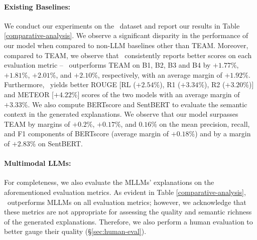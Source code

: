 


\paragraph{Existing Baselines:} We conduct our experiments on the \dataset\ dataset and report our results in Table \ref{comparative-analysis}. We observe a significant disparity in the performance of our model when compared to non-LLM baselines other than TEAM. Moreover, compared to TEAM, we observe that \model\ consistently reports better scores on each evaluation metric -- \model\ outperforms TEAM on B1, B2, B3 and B4 by $+1.77\%$, $+1.81\%$, $+2.01\%$, and $+2.10\%$, respectively, with an average margin of $+1.92\%$. Furthermore, \model\ yields better ROUGE [RL ($+2.54\%$), R1 ($+3.34\%$), R2 ($+3.20\%$)] and METEOR [$+4.22\%$] scores of the two models with an average margin of $+3.33\%$. 
We also compute BERTscore and SentBERT to evaluate the semantic context in the generated explanations. We observe that our model surpasses TEAM by margins of $+0.2\%$, $+0.17\%$, and $0.16\%$ on the mean precision, recall, and F1 components of BERTscore (average margin of $+0.18\%$) and by a margin of $+2.83\%$ on SentBERT. 


\paragraph{Multimodal LLMs:} For completeness, we also evaluate the MLLMs' explanations on the aforementioned evaluation metrics. As evident in Table \ref{comparative-analysis}, \model\ outperforms MLLMs on all evaluation metrics; however, we acknowledge that these metrics are not appropriate for assessing the quality and semantic richness of the generated explanations. Therefore, we also perform a human evaluation to better gauge their quality (\S \ref{sec:human-eval}).










